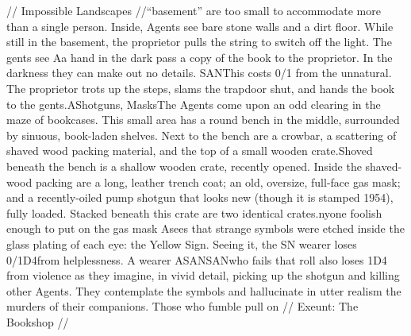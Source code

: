 \documentclass{report}
\begin{document}
\begin{multicols}{2}
// Impossible Landscapes //“basement” are too small to accommodate more than a single person. Inside, Agents see bare stone walls and a dirt floor. While still in the basement, the proprietor pulls the string to switch off the light. The gents see Aa hand in the dark pass a copy of the book to the proprietor. In the darkness they can make out no details. SANThis costs 0/1  from the unnatural. The proprietor trots up the steps, slams the trapdoor shut, and hands the book to the gents.AShotguns, MasksThe Agents come upon an odd clearing in the maze of bookcases. This small area has a round bench in the middle, surrounded by sinuous, book-laden shelves. Next to the bench are a crowbar, a scattering of shaved wood packing material, and the top of a small wooden crate.Shoved beneath the bench is a shallow wooden crate, recently opened. Inside the shaved-wood packing are a long, leather trench coat; an old, oversize, full-face gas mask; and a recently-oiled pump shotgun that looks new (though it is stamped 1954), fully loaded. Stacked beneath this crate are two identical crates.nyone foolish enough to put on the gas mask Asees that strange symbols were etched inside the glass plating of each eye: the Yellow Sign. Seeing it, the  SN wearer loses 0/1D4from helplessness. A wearer ASANSANwho fails that  roll also loses 1D4  from violence as they imagine, in vivid detail, picking up the shotgun and killing other Agents. They contemplate the symbols and hallucinate in utter realism the murders of their companions. Those who fumble pull on // Exeunt: The Bookshop //

\end{multicols}
\end{document}
